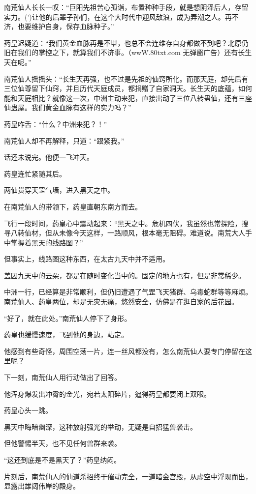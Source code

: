 \begin{this_body}
南荒仙人长长一叹：“巨阳先祖苦心孤诣，布置种种手段，就是想阴泽后人，存留实力。(’)让他的后辈子孙们，在这个大时代中迎风敌浪，成为弄潮之人。再不济，也要维护自身，保存血脉种子。”

药皇迟疑道：“我们黄金血脉再是不堪，也总不会连维存自身都做不到吧？北原仍旧在我们的掌控之下，就算我们不济事。（wwW.80txt.com 无弹窗广告）还有长生天在呢。”

南荒仙人摇摇头：“长生天再强，也不过是先祖的仙窍所化。而那天庭，却先后有三位仙尊留下仙窍，并且历代天庭成员，都捐赠了自家洞天。长生天的底蕴，如何能和天庭相比？就像这一次，中洲主动来犯，直接出动了三位八转蛊仙，还有三座仙蛊屋。我们黄金血脉有这样的实力吗？”

药皇咋舌：“什么？中洲来犯？！”

南荒仙人却不再解释，只道：“跟紧我。”

话还未说完。他便一飞冲天。

药皇连忙紧随其后。

两仙贯穿天罡气墙，进入黑天之中。

在南荒仙人的带领下，药皇直朝东南方而去。

飞行一段时间，药皇心中震动起来：“黑天之中。危机四伏，我虽然也常探险，搜寻八转仙材，但从未像今天这样，一路顺风，根本毫无阻碍。难道说。南荒大人手中掌握着黑天的线路图？”

但事实上，线路图这种东西，在太古九天中并不适用。

盖因九天中的云朵，都是在随时变化当中的。固定的地方也有，但是非常稀少。

中洲一行，已经算是非常顺利，但仍旧遭遇了气罡飞天猪群、乌毒蛇群等等麻烦。南荒仙人、药皇两位，却是无灾无痛，悠然安全，仿佛是在逛自家的后花园。

“好了，就在此处。”南荒仙人停下了身形。

药皇也缓慢速度，飞到他的身边，站定。

他感到有些奇怪，周围空荡一片，连一丝风都没有，怎么南荒仙人要专门停留在这里呢？

下一刻，南荒仙人用行动做出了回答。

他浑身爆发出冲霄的金光，宛若太阳碎片，逼得药皇都要闭上双眼。

药皇心头一跳。

黑天中晦暗幽深，这种放射强光的举动，无疑是自招猛兽袭击。

但他警惕半天，也不见任何兽群来袭。

“这还到底是不是黑天了？”药皇纳闷。

片刻后，南荒仙人的仙道杀招终于催动完全，一道暗金宫殿，从虚空中浮现而出，显露出雄阔伟岸的殿身。


\end{this_body}
